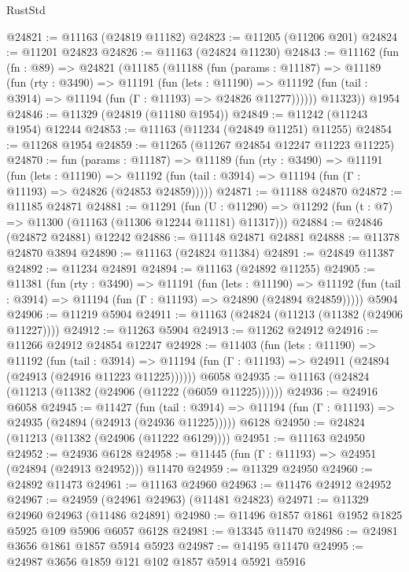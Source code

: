 \begin{lexlean}{RustStd}
\begin{coremodule}
@24821 := @11163 (@24819 @11182)
@24823 := @11205 (@11206 @201)
@24824 := @11201 @24823
@24826 := @11163 (@24824 @11230)
@24843 := @11162
    (fun (fn : @89) =>
    @24821
      (@11185
        (@11188
          (fun (params : @11187) =>
          @11189
            (fun (rty : @3490) =>
            @11191
              (fun (lets : @11190) =>
              @11192 (fun (tail : @3914) => @11194 (fun (Γ : @11193) => @24826 @11277))))))
        @11323))
    @1954
@24846 := @11329 (@24819 (@11180 @1954))
@24849 := @11242 (@11243 @1954) @12244
@24853 := @11163 (@11234 (@24849 @11251) @11255)
@24854 := @11268 @1954
@24859 := @11265 (@11267 @24854 @12247 @11223 @11225)
@24870 := fun (params : @11187) =>
  @11189
    (fun (rty : @3490) =>
    @11191
      (fun (lets : @11190) =>
      @11192 (fun (tail : @3914) => @11194 (fun (Γ : @11193) => @24826 (@24853 @24859)))))
@24871 := @11188 @24870
@24872 := @11185 @24871
@24881 := @11291
    (fun (U : @11290) => @11292 (fun (t : @7) => @11300 (@11163 (@11306 @12244 @11181) @11317)))
@24884 := @24846 (@24872 @24881) @12242
@24886 := @11148 @24871 @24881
@24888 := @11378 @24870 @3894
@24890 := @11163 (@24824 @11384)
@24891 := @24849 @11387
@24892 := @11234 @24891
@24894 := @11163 (@24892 @11255)
@24905 := @11381
    (fun (rty : @3490) =>
    @11191
      (fun (lets : @11190) =>
      @11192 (fun (tail : @3914) => @11194 (fun (Γ : @11193) => @24890 (@24894 @24859)))))
    @5904
@24906 := @11219 @5904
@24911 := @11163 (@24824 (@11213 (@11382 (@24906 @11227))))
@24912 := @11263 @5904
@24913 := @11262 @24912
@24916 := @11266 @24912 @24854 @12247
@24928 := @11403
    (fun (lets : @11190) =>
    @11192
      (fun (tail : @3914) =>
      @11194 (fun (Γ : @11193) => @24911 (@24894 (@24913 (@24916 @11223 @11225))))))
    @6058
@24935 := @11163 (@24824 (@11213 (@11382 (@24906 (@11222 (@6059 @11225))))))
@24936 := @24916 @6058
@24945 := @11427
    (fun (tail : @3914) => @11194 (fun (Γ : @11193) => @24935 (@24894 (@24913 (@24936 @11225)))))
    @6128
@24950 := @24824 (@11213 (@11382 (@24906 (@11222 @6129))))
@24951 := @11163 @24950
@24952 := @24936 @6128
@24958 := @11445 (fun (Γ : @11193) => @24951 (@24894 (@24913 @24952))) @11470
@24959 := @11329 @24950
@24960 := @24892 @11473
@24961 := @11163 @24960
@24963 := @11476 @24912 @24952
@24967 := @24959 (@24961 @24963) (@11481 @24823)
@24971 := @11329 @24960 @24963 (@11486 @24891)
@24980 := @11496 @1857 @1861 @1952 @1825 @5925 @109 @5906 @6057 @6128
@24981 := @13345 @11470
@24986 := @24981 @3656 @1861 @1857 @5914 @5923
@24987 := @14195 @11470
@24995 := @24987 @3656 @1859 @121 @102 @1857 @5914 @5921 @5916

\end{coremodule}
\end{lexlean}
